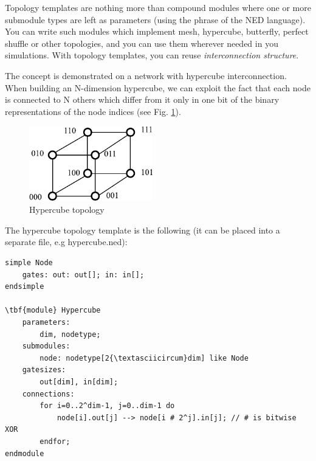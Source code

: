 

Topology templates are nothing more than compound modules where one or
more submodule types are left as parameters (using the
 phrase of the NED language).  You can
write such modules which implement mesh,
hypercube,
butterfly, perfect
shuffle or other topologies, and you
can use them wherever needed in you simulations.  With topology
templates, you can reuse
\textit{interconnection structure}.





The concept is demonstrated on a network with hypercube interconnection.
When building an N-dimension hypercube, we can exploit the fact
that each node is connected to N others which differ from it
only in one bit of the binary representations of the node indices
(see Fig. \ref{fig:ch-ned-lang:hypercube-topology}).

\begin{figure}[htbp]
  \begin{center}
    \includegraphics[width=2.111in, height=1.285in]{figures/usmanFig8}
    \caption{Hypercube topology}
    \label{fig:ch-ned-lang:hypercube-topology}
  \end{center}
\end{figure}


The hypercube topology template is the
following (it can be placed into a separate file, e.g hypercube.ned):


\begin{Verbatim}[commandchars=\\\{\}]
simple Node
    gates: out: out[]; in: in[];
endsimple

\tbf{module} Hypercube
    parameters:
        dim, nodetype;
    submodules:
        node: nodetype[2{\textasciicircum}dim] like Node
    gatesizes:
        out[dim], in[dim];
    connections:
        for i=0..2^dim-1, j=0..dim-1 do
            node[i].out[j] --> node[i # 2^j].in[j]; // # is bitwise XOR
        endfor;
endmodule
\end{Verbatim}



